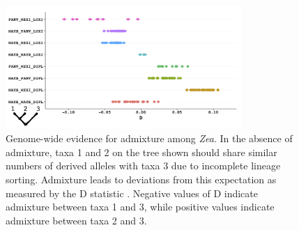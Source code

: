 \begin{figure}[]
  \centering
   \includegraphics[width=0.8\textwidth]{abbas}
    \caption{Genome-wide evidence for admixture among \emph{Zea}. In the absence of admixture, taxa 1 and 2 on the tree shown should share similar numbers of derived alleles with taxa 3 due to incomplete lineage sorting.  Admixture leads to deviations from this expectation as measured by the D statistic  \citep{green2010draft}. Negative values of D indicate admixture between taxa 1 and 3, while positive values indicate admixture between taxa 2 and 3.} 
\label{fig:abba}
\end{figure}



